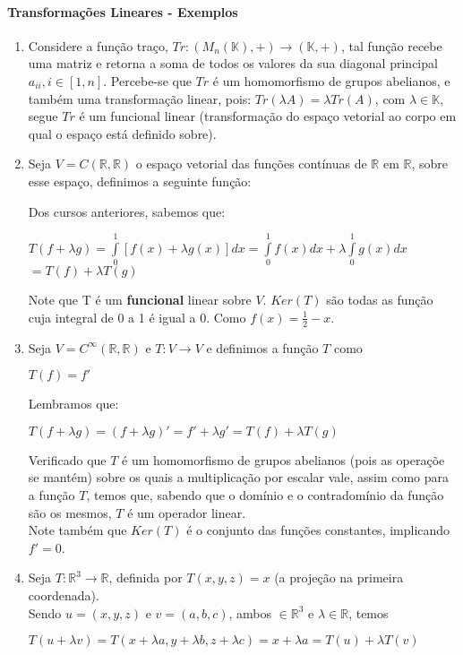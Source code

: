 \documentclass[12pt]{article}
\begin{document}
\paragraph{Transformações Lineares - Exemplos}
\begin{enumerate}
	\item Considere a função traço, $Tr: (M_n(\mathbb{K}),+) \rightarrow (\mathbb{K}, +)$, tal função recebe uma matriz e retorna a soma de todos os valores da sua diagonal principal $a_{ii}, i \in [1,n]$. Percebe-se que $Tr$ é um homomorfismo de grupos abelianos, e também uma transformação linear, pois: $Tr(\lambda A) = \lambda Tr(A)$, com $\lambda \in \mathbb{K}$, segue $Tr$ é um funcional linear (transformação do espaço vetorial ao corpo em qual o espaço está definido sobre).
	
	\item Seja $V = C(\mathbb{R},\mathbb{R})$ o espaço vetorial das funções contínuas de $\mathbb{R}$ em $\mathbb{R}$, sobre esse espaço, definimos a seguinte função:
	\begin{center}\end{center}
	Dos cursos anteriores, sabemos que:
	\begin{center}
		$T(f + \lambda g) = \int\limits^1_0 \left[ f(x) + \lambda g(x)\right] dx = \int\limits^1_0 f(x)dx + \lambda \int\limits^1_0 g(x)dx$\\
		$= T(f) + \lambda T(g)$
	\end{center}
	Note que T é um \textbf{funcional} linear sobre $V$. $Ker(T)$ são todas as função cuja integral de 0 a 1 é igual a 0. Como $f(x) = \frac{1}{2} - x$.
	
	\item Seja $V = C^{\infty}(\mathbb{R},\mathbb{R})$ e $T: V \rightarrow V$ e definimos a função $T$ como
		\begin{center}
			$T(f) = f'$
		\end{center}
		Lembramos que:
		\begin{center}
			$T(f + \lambda g) = (f + \lambda g)' = f' + \lambda g' = T(f) + \lambda T(g)$
		\end{center}
		Verificado que $T$ é um homomorfismo de grupos abelianos (pois as operaçõe se mantém) sobre os quais a multiplicação por escalar vale, assim como para a função $T$, temos que, sabendo que o domínio e o contradomínio da função são os mesmos, $T$ é um operador linear.\\
		Note também que $Ker(T)$ é o conjunto das funções constantes, implicando $f' = 0$.
		
	\item Seja $T: \mathbb{R}^3 \rightarrow \mathbb{R}$, definida por $T(x,y,z) = x$ (a projeção na primeira coordenada).\\
	Sendo $u = (x, y, z)$ e $v = (a, b, c)$, ambos $\in \mathbb{R}^3$ e $\lambda \in \mathbb{R}$, temos
	\begin{center}
		$T(u + \lambda v) = T(x + \lambda a, y + \lambda b, z + \lambda c) = x + \lambda a = T(u) + \lambda T(v)$
	\end{center}
\end{enumerate}
\end{document}
